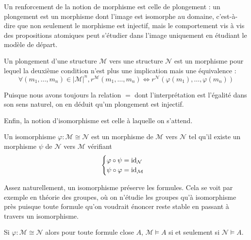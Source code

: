 Un renforcement de la notion de morphisme est celle de plongement : un
plongement est un morphisme dont l'image est isomorphe au domaine, c'est-à-dire
que non seulement le morphisme est injectif, mais le comportement vis à vis
des propositions atomiques peut s'étudier dans l'image uniquement en étudiant le
modèle de départ.

\begin{definition}[Plongement]
  Un plongement d'une structure $\mathcal M$ vers une structure $\mathcal N$ est
  un morphisme pour lequel la deuxième condition n'est plus une implication mais
  une équivalence :
  \[\forall(m_1,\ldots,m_n)\in|\mathcal M|^n,r^{\mathcal M}(m_1,\ldots,m_n) \iff
  r^{\mathcal N}(\varphi(m_1),\ldots,\varphi(m_n))\]
\end{definition}

\begin{remark}
  Puisque nous avons toujours la relation $=$ dont l'interprétation est
  l'égalité dans son sens naturel, on en déduit qu'un plongement est injectif.
\end{remark}

Enfin, la notion d'isomorphisme est celle à laquelle on s'attend.

\begin{definition}[Isomorphisme]
  Un isomorphisme $\varphi : \mathcal M \cong \mathcal N$ est un morphisme de
  $\mathcal M$ vers $\mathcal N$ tel qu'il existe un morphisme $\psi$ de
  $\mathcal N$ vers $\mathcal M$ vérifiant
  \[\begin{cases}
  \varphi\circ \psi = \operatorname{id}_{\mathcal N}\\
  \psi\circ\varphi = \operatorname{id}_{\mathcal M}
  \end{cases}\]
\end{definition}

Assez naturellement, un isomorphisme préserve les formules. Cela se voit par
exemple en théorie des groupes, où on n'étudie les groupes qu'à isomorphisme
près puisque toute formule qu'on voudrait énoncer reste stable en passant à
travers un isomorphisme.

\begin{proposition}
  Si $\varphi : \mathcal M \cong \mathcal N$ alors pour toute formule close $A$,
  $\mathcal M\models A$ si et seulement si $\mathcal N\models A$.
\end{proposition}

